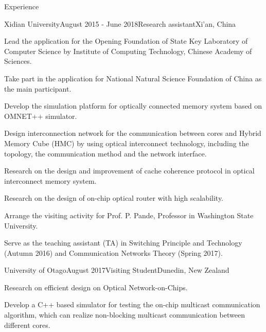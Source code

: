 \documentclass{resume} %
\begin{document}
\begin{rSection}{Experience}

\begin{rSubsection}{Xidian University}{August 2015 - June 2018}{Research assistant}{Xi'an, China}
\item Lead the application for the Opening Foundation of State Key Laboratory of Computer Science by Institute of Computing Technology, Chinese Academy of Sciences.
\item Take part in the application for National Natural Science Foundation of China as the main participant.
\item Develop the simulation platform for optically connected memory system based on OMNET++ simulator.
\item Design interconnection network for the communication between cores and Hybrid Memory Cube (HMC) by using optical interconnect technology, including the topology, the communication method and the network interface.
\item Research on the design and improvement of cache coherence protocol in optical interconnect memory system.
\item Research on the design of on-chip optical router with high scalability.
\item Arrange the visiting activity for Prof. P. Pande, Professor in Washington State University.
\item Serve as the teaching assistant (TA) in Switching Principle and Technology (Autumn 2016) and Communication Networks Theory (Spring 2017).
\end{rSubsection}

\begin{rSubsection}{University of Otago}{August 2017}{Visiting Student}{Dunedin, New Zealand}

\item Research on efficient design on Optical Network-on-Chips.
\item Develop a C++ based simulator for testing the on-chip multicast communication algorithm, which can realize non-blocking multicast communication between different cores.

\end{rSubsection}

\end{rSection}


\end{document}
